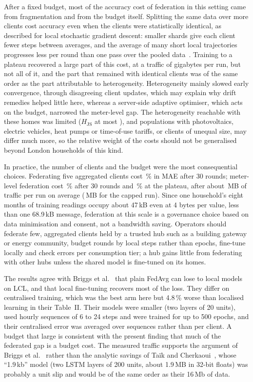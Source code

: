After a fixed budget, most of the accuracy cost of federation in this setting came from fragmentation and from the
budget itself. Splitting the same data over more clients cost accuracy even when the clients were statistically
identical, as described for local stochastic gradient descent: smaller shards give each client fewer steps between
averages, and the average of many short local trajectories progresses less per round than one pass over the pooled
data~\cite{stich2019localsgd,woodworth2020localsgd,woodworth2020minibatch}. Training to a plateau recovered a large part
of this cost, at a traffic of gigabytes per run, but not all of it, and the part that remained with identical clients
was of the same order as the part attributable to heterogeneity. Heterogeneity mainly slowed early convergence, through
disagreeing client updates, which may explain why drift remedies helped little here, whereas a server-side adaptive optimiser,
which acts on the budget, narrowed the meter-level gap. The heterogeneity
reachable with these homes was limited ($H_{\mathrm{JS}}$ at most \RvHJSHomeKhundred{}), and populations with
photovoltaics, electric vehicles, heat pumps or time-of-use tariffs, or clients of unequal size, may differ much more,
so the relative weight of the costs should not be generalised beyond London households of this kind.

In practice, the number of clients and the budget were the most consequential choices. Federating five aggregated
clients cost \RvHomeKfiveGap{}\,\% in MAE after 30 rounds; meter-level federation cost \RvHomeKhundredGap{}\,\% after 30
rounds and \RvPlhomesKhundredGap{}\,\% at the plateau, after about \RvPlhomesKhundredMBtotal{}\,MB of traffic per run on average (\RvPlhomesKhundredCapMB{}\,MB for the capped run). Since one
household's eight months of training readings occupy about 47\,kB even at 4 bytes per value, less than one 68.9\,kB
message, federation at this scale is a governance choice based on data minimisation and consent, not a bandwidth
saving. Operators should federate few, aggregated clients held by a trusted hub such as a building gateway or energy
community, budget rounds by local steps rather than epochs, fine-tune locally and check errors per consumption tier;
a hub gains little from federating with other hubs unless the shared model is fine-tuned on its homes.

The results agree with Briggs et al.~\cite{briggs2022} that plain FedAvg can lose to local models on LCL, and that
local fine-tuning recovers most of the loss. They differ on centralised training, which was the best arm here but
4.8\,\% worse than localised learning in their Table~II. Their models were smaller (two layers of 20 units), used hourly
sequences of 6 to 24 steps and were trained for up to 500 epochs, and their centralised error was averaged over
sequences rather than per client. A budget that large is consistent with the present finding that much of the federated
gap is a budget cost. The measured traffic supports the argument of Briggs et al.~\cite{briggs2020ccai} rather than the
analytic savings of Taïk and Cherkaoui~\cite{taik2020}, whose ``1.9\,kb'' model (two LSTM layers of 200 units, about
1.9\,MB in 32-bit floats) was probably a unit slip and would be of the same order as their 16\,Mb of data.

